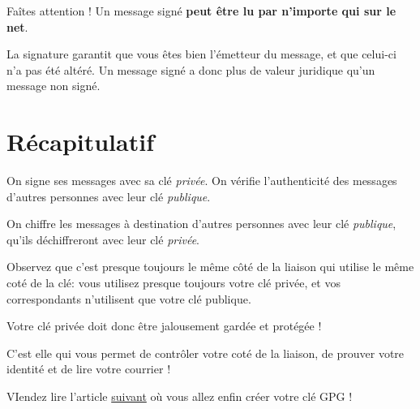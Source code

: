 Faîtes attention ! Un message signé \textbf{peut être lu par n'importe
qui sur le net}.

La signature garantit que vous êtes bien l'émetteur du message, et que
celui-ci n'a pas été altéré. Un message signé a donc plus de valeur
juridique qu'un message non signé.

\section{Récapitulatif}\label{ruxe9capitulatif}

On signe ses messages avec sa clé \emph{privée}. On vérifie
l'authenticité des messages d'autres personnes avec leur clé
\emph{publique}.

On chiffre les messages à destination d'autres personnes avec leur clé
\emph{publique}, qu'ils déchiffreront avec leur clé \emph{privée}.

Observez que c'est presque toujours le même côté de la liaison qui
utilise le même coté de la clé: vous utilisez presque toujours votre clé
privée, et vos correspondants n'utilisent que votre clé publique.

Votre clé privée doit donc être jalousement gardée et protégée !


C'est elle qui vous permet de contrôler votre coté de la liaison, de
prouver votre identité et de lire votre courrier !

VIendez lire l'article \href{\{filename\}4-key-generate-fr.md}{suivant}
où vous allez enfin créer votre clé GPG !

